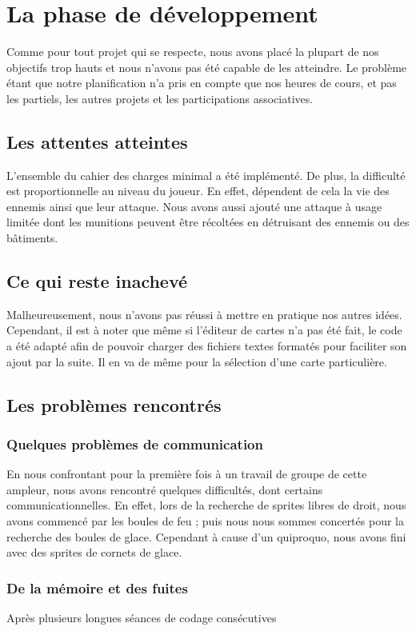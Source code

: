 \section{La phase de développement}

Comme pour tout projet qui se respecte, nous avons placé la plupart de nos objectifs trop hauts et nous n'avons pas été capable de les atteindre. Le problème étant que notre planification n'a pris en compte que nos heures de cours, et pas les partiels, les autres projets et les participations associatives.

\subsection{Les attentes atteintes}

L'ensemble du cahier des charges minimal a été implémenté. De plus, la difficulté est proportionnelle au niveau du joueur. En effet, dépendent de cela la vie des ennemis ainsi que leur attaque. 
Nous avons aussi ajouté une attaque à usage limitée dont les munitions peuvent être récoltées en détruisant des ennemis ou des bâtiments.

\subsection{Ce qui reste inachevé}

Malheureusement, nous n'avons pas réussi à mettre en pratique nos autres idées. Cependant, il est à noter que même si l'éditeur de cartes n'a pas été fait, le code a été adapté afin de pouvoir charger des fichiers textes formatés pour faciliter son ajout par la suite. Il en va de même pour la sélection d'une carte particulière.  

\subsection{Les problèmes rencontrés}

\subsubsection{Quelques problèmes de communication}
 
En nous confrontant pour la première fois à un travail de groupe de cette ampleur, nous avons rencontré quelques difficultés, dont certains communicationnelles. En effet, lors de la recherche de sprites libres de droit, nous avons commencé par les boules de feu ; puis nous nous sommes concertés pour la recherche des boules de glace. Cependant à cause d'un quiproquo, nous avons fini avec des sprites de cornets de glace. 

\subsubsection{De la mémoire et des fuites}

Après plusieurs longues séances de codage consécutives
